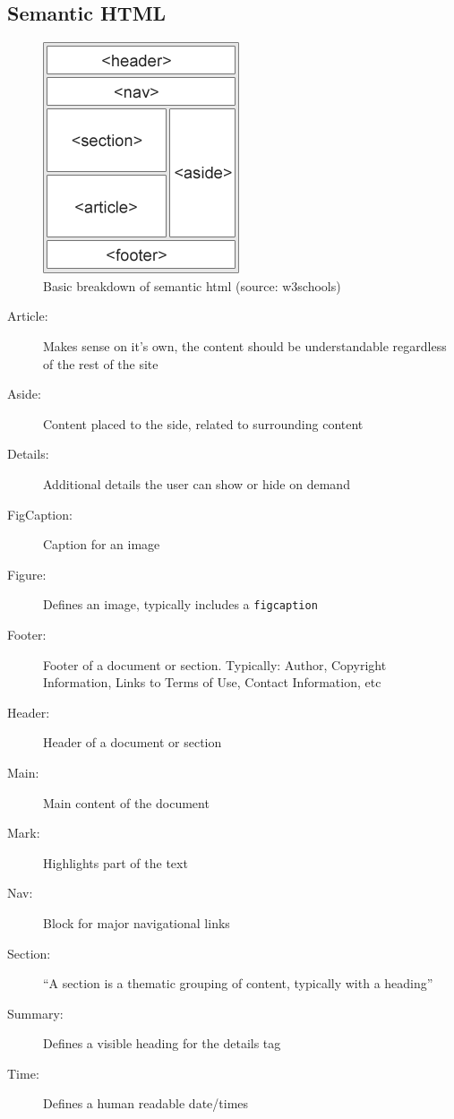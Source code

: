 \documentclass[12pt, a4paper]{article}
\begin{document}
	\pagestyle{fancy}
	\begin{multicols}{2}
		\tableofcontents
		
		\section{Semantic HTML}
		\begin{figure}[H]
			\centering
			\includegraphics[width=0.7\linewidth]{img_sem_elements}
			\caption{Basic breakdown of semantic html (source: w3schools)}	
		\end{figure}
	
		\begin{description}
			\item[Article:] Makes sense on it's own, the content should be understandable regardless of the rest of the site
			\item[Aside:] Content placed to the side, related to surrounding content
			\item[Details:] Additional details the user can show or hide on demand
			\item[FigCaption:] Caption for an image
			\item[Figure:] Defines an image, typically includes a \texttt{figcaption}
			\item[Footer:] Footer of a document or section. Typically: Author, Copyright Information, Links to Terms of Use, Contact Information, etc
			\item[Header:] Header of a document or section
			\item[Main:] Main content of the document
			\item[Mark:] Highlights part of the text
			\item[Nav:] Block for major navigational links
			\item[Section:] ``A section is a thematic grouping of content, typically with a heading''
			\item[Summary:] Defines a visible heading for the details tag
			\item[Time:] Defines a human readable date/times
		\end{description}
		

\end{multicols}
\end{document}
